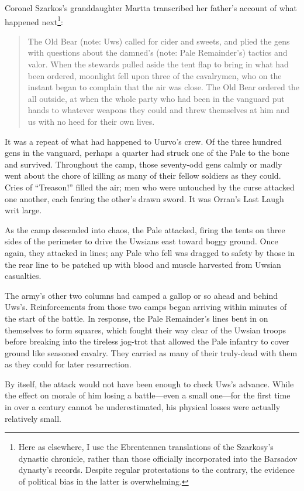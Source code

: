 \documentclass[12pt]{report}
\begin{document}
Coronel Szarkos's granddaughter Martta transcribed her father's
account of what happened next\footnote{Here as elsewhere, I use the
Ebrentennen translations of the Szarkosy's dynastic chronicle, rather
than those officially incorporated into the Barsadov dynasty's
records.  Despite regular protestations to the contrary, the evidence
of political bias in the latter is overwhelming.}:

\begin{quotation}
The Old Bear (note: Uws) called for cider and sweets, and plied the
gens with questions about the damned's (note: Pale Remainder's)
tactics and valor.  When the stewards pulled aside the tent flap to
bring in what had been ordered, moonlight fell upon three of the
cavalrymen, who on the instant began to complain that the air was
close.  The Old Bear ordered the all outside, at when the whole party
who had been in the vanguard put hands to whatever weapons they could
and threw themselves at him and us with no heed for their own lives.
\end{quotation}

It was a repeat of what had happened to Uurvo's crew.  Of the three
hundred gens in the vanguard, perhaps a quarter had struck one of the
Pale to the bone and survived.  Throughout the camp, those seventy-odd
gens calmly or madly went about the chore of killing as many of their
fellow soldiers as they could.  Cries of ``Treason!''  filled the air;
men who were untouched by the curse attacked one another, each fearing
the other's drawn sword.  It was Orran's Last Laugh writ large.

As the camp descended into chaos, the Pale attacked, firing the tents
on three sides of the perimeter to drive the Uwsians east toward boggy
ground.  Once again, they attacked in lines; any Pale who fell was
dragged to safety by those in the rear line to be patched up with
blood and muscle harvested from Uwsian casualties.

The army's other two columns had camped a gallop or so ahead and
behind Uws's.  Reinforcements from those two camps began arriving
within minutes of the start of the battle.  In response, the Pale
Remainder's lines bent in on themselves to form squares, which fought
their way clear of the Uwsian troops before breaking into the tireless
jog-trot that allowed the Pale infantry to cover ground like seasoned
cavalry.  They carried as many of their truly-dead with them as they
could for later resurrection.

By itself, the attack would not have been enough to check Uws's
advance.  While the effect on morale of him losing a battle---even a
small one---for the first time in over a century cannot be
underestimated, his physical losses were actually relatively small.
\end{document}
